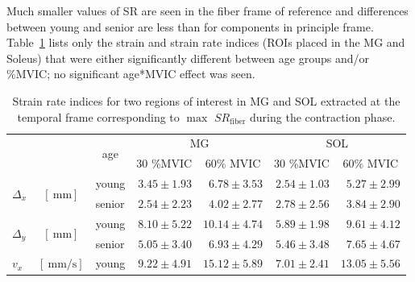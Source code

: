 Much smaller values of SR are seen in the fiber frame of reference and differences between young and senior are less than for components in principle frame. 
Table~\ref{tab: CSYO1} lists only the strain and strain rate indices (ROIs placed in the MG and Soleus) that were either significantly different between age groups and/or \%MVIC; no significant age*MVIC effect was seen.
\begin{table}[!htb]
\vspace{+0.2cm}
\caption[Strain rate indices for two regions of interest in MG and SOL extracted at the the peak of the contraction]{Strain rate indices for two regions of interest in MG and SOL extracted at the temporal frame corresponding to $\max$ $SR_{\mathrm{fiber}}$ during the contraction phase.}
\label{tab: CSYO1}
\begin{center}
\begin{threeparttable}
\begin{tabular}{@{}lclrrrr@{}}
\toprule[1pt]\midrule[0.3pt]
\multicolumn{2}{l}{\multirow{2}{*}{}} & \multicolumn{1}{c}{\multirow{2}{*}{age}} & \multicolumn{2}{c}{MG}                                      &  \multicolumn{2}{c}{SOL}                                     \\ \cmidrule(lr){4-5} \cmidrule(lr){6-7} 
\multicolumn{2}{l}{}                  & \multicolumn{1}{c}{}                           & \multicolumn{1}{c}{30 \%MVIC} & \multicolumn{1}{c}{60\% MVIC} &  \multicolumn{1}{c}{30 \%MVIC} & \multicolumn{1}{c}{60\% MVIC} \\ \midrule[0.3pt]
\multirow{2}{*}{$\Delta_x$}\tnote{$1$, $2$, $4$}				& \multirow{2}{*}{$\left[\SI{}{\milli\meter}\right]$}   		 	& young     & $3.45 \pm 1.93$   & $6.78 \pm 3.53$  &  $2.54 \pm 1.03$  & $5.27 \pm 2.99$   \\
	  	  													&                  							     				& senior    & $2.54 \pm 2.23$   & $4.02 \pm 2.77$  &  $2.78 \pm 2.56$  & $3.84 \pm 2.90$   \\[4pt]
\multirow{2}{*}{$\Delta_y$}\tnote{$1$, $4$}					& \multirow{2}{*}{$\left[\SI{}{\milli\meter}\right]$}	   		& young     & $8.10 \pm 5.22$   & $10.14 \pm 4.74$ &  $5.89 \pm 1.98$  & $9.61 \pm 4.12$   \\
						    								&                   							     			  	& senior    & $5.05 \pm 3.40$   & $6.93 \pm 4.29$  &  $5.46 \pm 3.48$  & $7.65 \pm 4.67$   \\[4pt]
\multirow{2}{*}{$v_x$}\tnote{$1$, $2$, $4$}					& \multirow{2}{*}{$\left[\SI{}{\milli\meter/\second}\right]$} 	& young     & $9.22 \pm 4.91$   & $15.12 \pm 5.89$ &  $7.01 \pm 2.41$  & $13.05 \pm 5.56$  \\

\end{tabular}
\end{threeparttable}
\end{center}
\end{table}

